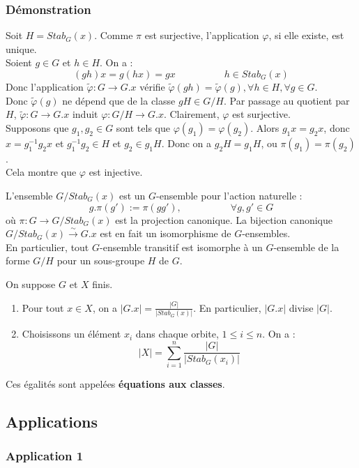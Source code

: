\documentclass[a4paper, oneside]{report}
\theoremstyle{break}
\newcommand{\dem}{\subsubsection{Démonstration}}
\newcommand{\fong}{\overset{\sim}{\rightarrow}}
\begin{document}
\dem
Soit $H=Stab_G(x)$. Comme $\pi$ est surjective, l'application $\varphi$, si elle existe, est unique.\\
Soient $g\in G$ et $h\in H$. On a :
$$(gh)x = g(hx)=gx\hspace{5em}h\in Stab_G(x)$$
Donc l'application $\tilde{\varphi}: G\rightarrow G.x$ vérifie $\tilde{\varphi}(gh)=\tilde{\varphi}(g), \forall h\in H, \forall g\in G$.\\
Donc $\tilde{\varphi}(g)$ ne dépend que de la classe $gH\in G/H$. Par passage au quotient par $H$, $\tilde{\varphi}:G \rightarrow G.x$ induit $\varphi :G/H \rightarrow G.x$. Clairement, $\varphi$ est surjective.\\
Supposons que $g_1, g_2\in G$ sont tels que $\varphi(g_1)=\varphi(g_2)$. Alors $g_1x=g_2x$, donc $x=g_1^{-1}g_2x$ et $g_1^{-1}g_2\in H$ et $g_2\in g_1H$. Donc on a $g_2H=g_1H$, ou $\pi(g_1)=\pi(g_2)$.\\
Cela montre que $\varphi$ est injective.

\remar
L'ensemble $G/Stab_G(x)$ est un $G$-ensemble pour l'action naturelle :
$$ g.\pi(g') := \pi(gg'),\hspace{5em}\forall g,g'\in G$$
où $\pi : G\rightarrow G/Stab_G(x)$ est la projection canonique. La bijection canonique $G/Stab_G(x)\fong G.x$ est en fait un isomorphisme de $G$-ensembles.\\
En particulier, tout $G$-ensemble transitif est isomorphe à un $G$-ensemble de la forme $G/H$ pour un sous-groupe $H$ de $G$.

\cor
On suppose $G$ et $X$ finis.
\begin{enumerate}
\item Pour tout $x\in X$, on a $|G.x|=\frac{|G|}{|Stab_G(x)|}$. En particulier, $|G.x|$ divise $|G|$.
\item Choisissons un élément $x_i$ dans chaque orbite, $1\leq i \leq n$. On a :
$$|X|=\sum_{i=1}^{n}\frac{|G|}{|Stab_G(x_i)|}$$
\end{enumerate}

\remar
Ces égalités sont appelées \textbf{équations aux classes}.

\subsection{Applications}

\subsubsection{Application 1}
\end{document}
